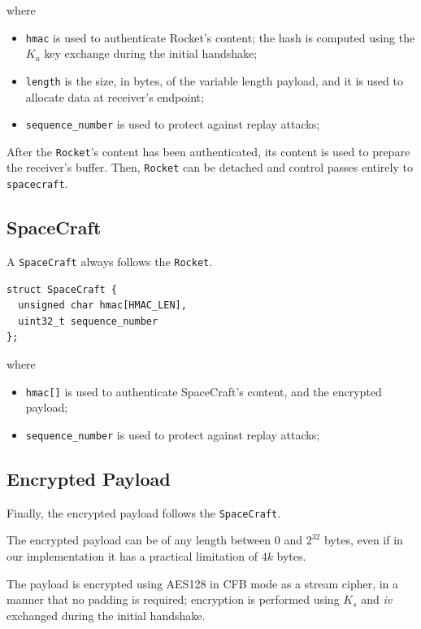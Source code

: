 \documentclass[a4paper,12pt]{article}
\begin{document}
where

\begin{itemize}
  \item \texttt{hmac} is used to authenticate Rocket's content; the hash is computed using the $K_a$ key exchange during the initial handshake;
  \item \texttt{length} is the size, in bytes, of the variable length payload, and it is used to allocate data at receiver's endpoint;
  \item \texttt{sequence\_number} is used to protect against replay attacks;
\end{itemize}

After the \texttt{Rocket}'s content has been authenticated, its content is used to prepare the receiver's buffer.
Then, \texttt{Rocket} can be detached and control passes entirely to \texttt{spacecraft}.

\subsection{SpaceCraft}
A \texttt{SpaceCraft} always follows the \texttt{Rocket}.

\begin{verbatim}
struct SpaceCraft {
  unsigned char hmac[HMAC_LEN],
  uint32_t sequence_number
};
\end{verbatim}

where

\begin{itemize}
  \item \texttt{hmac[]} is used to authenticate SpaceCraft's content, and the encrypted payload;
  \item \texttt{sequence\_number} is used to protect against replay attacks;
\end{itemize}

\subsection{Encrypted Payload}
Finally, the encrypted payload follows the \texttt{SpaceCraft}.

The encrypted payload can be of any length between $0$ and $2^{32}$ bytes, even if in our implementation it has a practical limitation of $4k$ bytes.

The payload is encrypted using AES128 in CFB mode as a stream cipher, in a manner that no padding is required;
encryption is performed using $K_s$ and \emph{iv} exchanged during the initial handshake.
\end{document}
